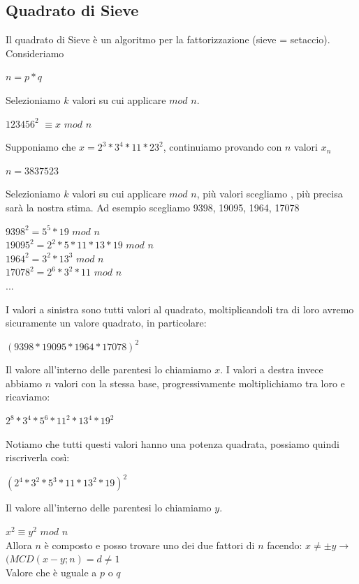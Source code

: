 \documentclass[11pt, oneside]{article}   	%
\begin{document}
\subsection*{Quadrato di Sieve}
Il quadrato di Sieve è un algoritmo per la fattorizzazione (sieve = setaccio).
Consideriamo \begin{center}
$n = p * q$
\end{center}
Selezioniamo $k$ valori su cui applicare $mod$ $n$.
\begin{center}
$123456 ^2$ $\equiv x$ $mod$ $n$ 
\end{center}
Supponiamo che $x = 2^3*3^4*11*23^2$, continuiamo provando con $n$ valori $x_n$

\begin{center}
$n = 3837523$
\end{center}
Selezioniamo $k$ valori su cui applicare $mod$ $n$, più valori scegliamo , più precisa sarà la nostra stima. Ad esempio scegliamo 9398, 19095, 1964, 17078
\begin{center}
$9398^2 = 5^5 * 19$ $mod$ $n$\\
$19095^2 = 2^2 * 5 * 11 * 13 * 19$ $mod$ $n$\\
$1964^2 = 3^2 * 13^3$ $mod$ $n$\\
$17078^2 = 2^6 * 3^2 * 11$ $mod$ $n$\\
...
\end{center}
I valori a sinistra sono tutti valori al quadrato, moltiplicandoli tra di loro avremo sicuramente un valore quadrato, in particolare:
\begin{center}
$(9398 * 19095 * 1964 * 17078)^2$
\end{center}
Il valore all'interno delle parentesi lo chiamiamo $x$.
I valori a destra invece abbiamo $n$ valori con la stessa base, progressivamente moltiplichiamo tra loro e ricaviamo:
\begin{center}
$2^8*3^4*5^6*11^2*13^4*19^2$
\end{center}
Notiamo che tutti questi valori hanno una potenza quadrata, possiamo quindi riscriverla così:
\begin{center}
$(2^4*3^2*5^3*11*13^2*19)^2$
\end{center}
Il valore all'interno delle parentesi lo chiamiamo $y$.
\begin{center}
$x^2 \equiv y^2$ $mod$ $n$\\
Allora $n$ è composto e posso trovare uno dei due fattori di $n$ facendo: $x \neq \pm y\rightarrow$ $ (MCD(x-y; n) = d \neq 1$\\
Valore che è uguale a $p$ o $q$
\end{center}
\end{document}
